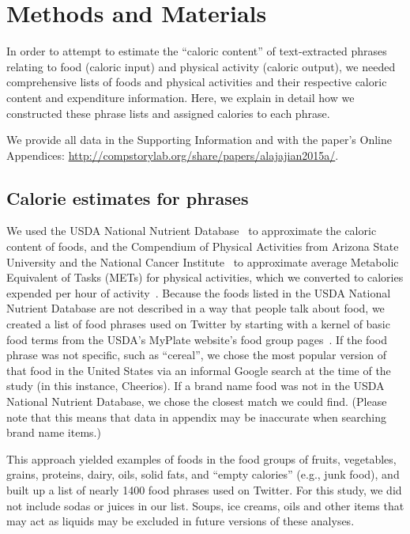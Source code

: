 \documentclass[10pt]{article}
\begin{document}
\section*{Methods and Materials}
\label{sec:fluxwell.methods}

In order to attempt to estimate the ``caloric content''
of text-extracted phrases~\cite{williams2014a} relating to food
(caloric input) and physical activity (caloric output), we needed
comprehensive lists of foods and physical activities and their
respective caloric content and expenditure information.
Here, we explain in detail how we constructed these phrase lists 
and assigned calories to each phrase.

We provide all data in the Supporting Information
and with the paper's Online Appendices:
\url{http://compstorylab.org/share/papers/alajajian2015a/}.

\subsection*{Calorie estimates for phrases}
\label{subsec:fluxwell.methods-phrases-to-calories}

We used the USDA National Nutrient Database~\cite{usda} to approximate
the caloric content of foods, and the Compendium of Physical Activities
from Arizona State University and the National Cancer
Institute~\cite{compendium} to approximate average Metabolic
Equivalent of Tasks (METs) for physical activities, which we converted
to calories expended per hour of activity~\cite{compendium}.
Because the foods listed in the USDA National Nutrient Database are
not described in a way that people talk about food, we created a list
of food phrases used on Twitter by starting with a kernel of basic
food terms from the USDA's MyPlate website's food group
pages~\cite{myplate}.
If the food phrase was not specific, such as ``cereal'', we chose the
most popular version of that food in the United States via an informal
Google search at the time of the study (in this instance, Cheerios).
If a brand name food was not in the USDA National Nutrient Database,
we chose the closest match we could find.  
(Please note that this means that data in appendix may be inaccurate
when searching brand name items.)

This approach yielded examples of foods in the food groups of fruits,
vegetables, grains, proteins, dairy, oils, solid fats, and 
``empty calories'' (e.g., junk food), 
and built up a list of nearly 1400 food phrases used on Twitter.
For this study, we did not include sodas or juices in our list.
Soups, ice creams, oils and other items that may act as liquids may be
excluded in future versions of these analyses.
\end{document}
